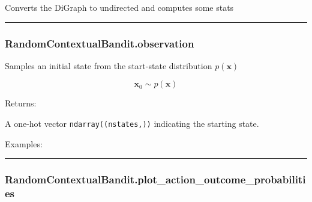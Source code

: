 Converts the DiGraph to undirected and computes some stats

\begin{center}\rule{0.5\linewidth}{\linethickness}\end{center}

\subsubsection{RandomContextualBandit.observation}\label{randomcontextualbandit.observation}

\begin{Shaded}
\begin{Highlighting}[]
\NormalTok{)}
\end{Highlighting}
\end{Shaded}

Samples an initial state from the start-state distribution
\(p(\mathbf x)\)

\[
\mathbf x_0 \sim p(\mathbf x)
\]

Returns:

A one-hot vector \texttt{ndarray((nstates,))} indicating the starting
state.

Examples:

\begin{Shaded}
\begin{Highlighting}[]
\OperatorTok{=}
\end{Highlighting}
\end{Shaded}

\begin{center}\rule{0.5\linewidth}{\linethickness}\end{center}

\subsubsection{RandomContextualBandit.plot\_action\_outcome\_probabilities}\label{randomcontextualbandit.plot_action_outcome_probabilities}

\begin{Shaded}
\begin{Highlighting}[]
\OperatorTok{=}\OperatorTok{=}\OperatorTok{=}\OperatorTok{=}\NormalTok{)}
\end{Highlighting}
\end{Shaded}

